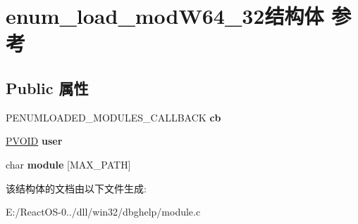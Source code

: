 \hypertarget{structenum__load__mod_w64__32}{}\section{enum\+\_\+load\+\_\+mod\+W64\+\_\+32结构体 参考}
\label{structenum__load__mod_w64__32}
\subsection*{Public 属性}
\begin{DoxyCompactItemize}
\item 
\mbox{\label{structenum__load__mod_w64__32_ab53fee27083e045d2d4cdce03c4d8855}} 
P\+E\+N\+U\+M\+L\+O\+A\+D\+E\+D\+\_\+\+M\+O\+D\+U\+L\+E\+S\+\_\+\+C\+A\+L\+L\+B\+A\+CK {\bfseries cb}
\item 
\mbox{\label{structenum__load__mod_w64__32_a596a570e4995f84e2029ed601735eac8}} 
\hyperlink{interfacevoid}{P\+V\+O\+ID} {\bfseries user}
\item 
\mbox{\label{structenum__load__mod_w64__32_aae1cf6f08c28315a2005973d8ec9a9ad}} 
char {\bfseries module} \mbox{[}M\+A\+X\+\_\+\+P\+A\+TH\mbox{]}
\end{DoxyCompactItemize}


该结构体的文档由以下文件生成\+:\begin{DoxyCompactItemize}
\item 
E\+:/\+React\+O\+S-\/0../dll/win32/dbghelp/module.\+c\end{DoxyCompactItemize}
